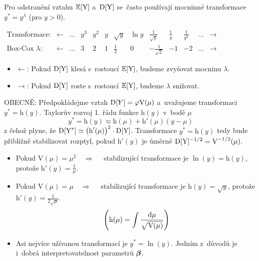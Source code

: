 \begin{enumerate}
Pro odstranění vztahu $\mathbb{E} [\text{Y}]$ a~$\mathrm{D}[\text{Y}]$ se~často používají mocninné transformace $y^* = y^{\lambda}$ (pro $y > 0$).

\begin{table}[h]
\centering
 $ \begin{array}{ *{13}{c} }
\text{Transformace:} & \leftarrow &\dots &  y^3 &  y^2 &  y & \sqrt{y}  & \ln y & \frac{1}{\sqrt{y}}  & \frac{1}{y} & \frac{1}{y^2} &\dots  & \rightarrow \\
\text{Box-Cox } \lambda : &\leftarrow  &\dots & 3 & 2 & 1 & \frac{1}{2}  & 0 &  -\frac{1}{\sqrt{2}} & -1 & -2 &\dots & \rightarrow
\end{array} $
\end{table}

\begin{itemize}
	\item $\leftarrow$: Pokud $\mathrm{D}[\text{Y}]$ klesá s~rostoucí $\mathbb{E}[\text{Y}]$, budeme zvyšovat mocninu $\lambda$.
	\item $\rightarrow$: Pokud $\mathrm{D}[\text{Y}]$ roste s~rostoucí $\mathbb{E}[\text{Y}]$, budeme $\lambda$ snižovat.
\end{itemize}

\end{enumerate}


OBECNĚ: Předpokládejme vztah $\mathrm{D}[Y] = \varphi \text{V}(\mu)$ a~uvažujeme transformaci $y^* = \text{h}(y)$. Taylorův rozvoj 1. řádu funkce $\text{h}(y)$ v~bodě $\mu$
 $$
 y^* = \text{h}(y) \approx \text{h}(\mu) + \text{h}'(\mu)(y-\mu)
 $$
z čehož plyne, že $\mathrm{D}[\text{Y}^*] \simeq \big(\text{h}'(\mu)\big)^2 \cdot \mathrm{D}[\text{Y}]$.
Transformace $y^* = \text{h}(y)$ tedy bude přibližně stabilizovat rozptyl, pokud $\text{h}'(y)$ je úměrné $\mathrm{D}[\text{Y}]^{-1/2} = \text{V}^{-1/2}(\mu)$.

\begin{itemize}
\item Pokud $\text{V}(\mu) = \mu^2 \quad \Rightarrow \quad$ stabilizující transformace je $\ln (y) = \text{h}(y)$, protože $\text{h}'(y) = \frac{1}{\mu}$.
\item Pokud $\text{V}(\mu) = \mu \quad \Rightarrow \quad$ stabilizující transformace je $\text{h}(y) = \sqrt{y}$, protože $\text{h}'(y) = \frac{1}{2 \sqrt{\mu}}$.
 $$
 \left(\text{h}(\mu) = \int \frac{\mathrm{d} \mu}{\sqrt{\text{V}(\mu)}} \right)
 $$
\item Asi nejvíce užívanou transformací je $y^* = \ln (y)$. Jedním z~důvodů je i~dobrá interpretovatelnost parametrů $\boldsymbol{\beta}$.
\end{itemize}

